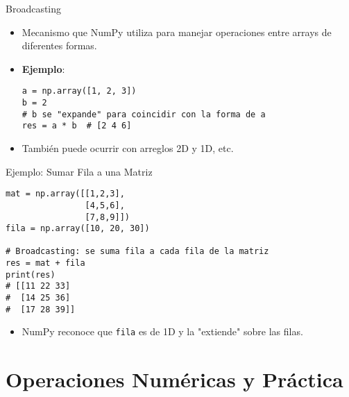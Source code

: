 \documentclass[10pt]{beamer}
\begin{document}
\begin{frame}[fragile]{Broadcasting}
  \begin{itemize}
    \item Mecanismo que NumPy utiliza para manejar operaciones entre arrays de diferentes formas.
    \item \textbf{Ejemplo}:
\begin{verbatim}
a = np.array([1, 2, 3])
b = 2
# b se "expande" para coincidir con la forma de a
res = a * b  # [2 4 6]
\end{verbatim}
    \item También puede ocurrir con arreglos 2D y 1D, etc.
  \end{itemize}
\end{frame}

\begin{frame}[fragile]{Ejemplo: Sumar Fila a una Matriz}
\begin{verbatim}
mat = np.array([[1,2,3],
                [4,5,6],
                [7,8,9]])
fila = np.array([10, 20, 30])

# Broadcasting: se suma fila a cada fila de la matriz
res = mat + fila
print(res)
# [[11 22 33]
#  [14 25 36]
#  [17 28 39]]
\end{verbatim}
\begin{itemize}
  \item NumPy reconoce que \texttt{fila} es de 1D y la "extiende" sobre las filas.
\end{itemize}
\end{frame}

\section{Operaciones Numéricas y Práctica}
\end{document}
